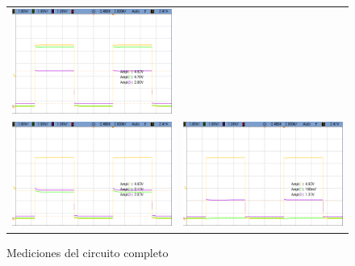 \begin{figure}[H]
\begin{tabular}{c c}
        \includegraphics[scale=0.2]{../EJ5/Mediciones/Osciloscopio/CONEXION/cropped_con_carga_baja.png} \\
        \includegraphics[scale=0.2]{../EJ5/Mediciones/Osciloscopio/CONEXION/cropped_con_carga_alta.png} &
        \includegraphics[scale=0.2]{../EJ5/Mediciones/Osciloscopio/CONEXION/cropped_con_carga_excedida.png} \\
    \end{tabular}
    \caption{Mediciones del circuito completo}
    \label{fig:circuit_complete_measures}
\end{figure}

